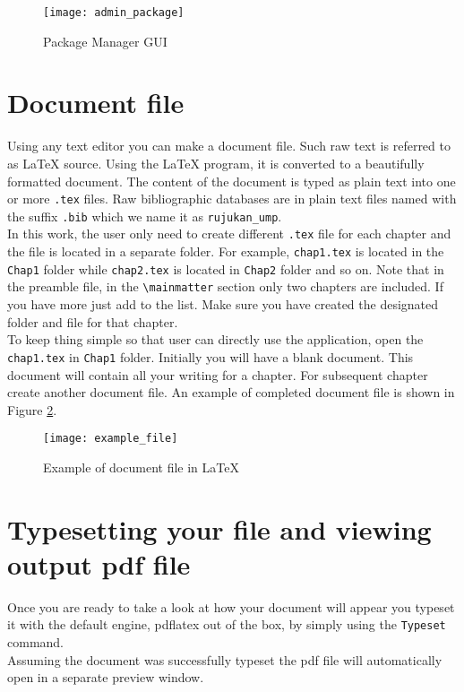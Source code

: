\begin{figure}
	\centering
	\texttt{[image: admin\_package]} 
	\caption{Package Manager GUI}
	\label{fig2:package_manager}
\end{figure}

\section{Document file}

Using any text editor you can make a document file. Such raw text is referred to as {\LaTeX} source. Using the LaTeX program, it is converted to a beautifully formatted document. The content of the document is typed as plain text into one or more \verb+.tex+ files. Raw bibliographic databases are in plain text files named with the suffix \verb+.bib+ which we name it as \verb+rujukan_ump+.\\

In this work, the user only need to create different \verb+.tex+ file for each chapter and the file is located in a separate folder. For example, \verb+chap1.tex+ is located in the \verb+Chap1+ folder while \verb+chap2.tex+ is located in \verb+Chap2+ folder and so on. Note that in the preamble file, in the \verb+\mainmatter+ section only two chapters are included. If you have more just add \verb++ to the list. Make sure you have created the designated folder and file for that chapter. \\

To keep thing simple so that user can directly use the application, open the \verb+chap1.tex+ in \verb+Chap1+ folder. Initially you will have a blank document. This document will contain all your writing for a chapter. For subsequent chapter create another document file. An example of completed document file is shown in Figure \ref{fig1:example_file}.

\begin{figure}
	\centering
	\texttt{[image: example\_file]} 
	\caption{Example of document file in {\LaTeX}}
	\label{fig1:example_file}
\end{figure}

\section{Typesetting your file and viewing output pdf file}
Once you are ready to take a look at how your document will appear you typeset it with the default engine, pdflatex out of the box, by simply using the \verb+Typeset+ command.\\

Assuming the document was successfully typeset the pdf file will automatically open in a separate preview window.







